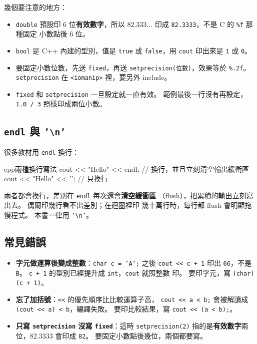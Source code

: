 
幾個要注意的地方：

\begin{itemize}
\item \texttt{double} 預設印 $6$ 位\textbf{有效數字}，所以
$82.333\ldots$ 印成 \texttt{82.3333}，不是 C 的 \texttt{\%f} 那種固定
小數點後 $6$ 位。
\item \texttt{bool} 是 C++ 內建的型別，值是 \texttt{true} 或
\texttt{false}，用 \texttt{cout} 印出來是 \texttt{1} 或 \texttt{0}。
\item 要固定小數位數，先送 \texttt{fixed}，再送
\texttt{setprecision(位數)}，效果等於 \texttt{\%.2f}。
\texttt{setprecision} 在 \texttt{<iomanip>} 裡，要另外 include。
\item \texttt{fixed} 和 \texttt{setprecision} 一旦設定就一直有效。
範例最後一行沒有再設定，\texttt{1.0 / 3} 照樣印成兩位小數。
\end{itemize}

\subsection{\texttt{endl} 與 \texttt{'\textbackslash n'}}

很多教材用 \texttt{endl} 換行：

\begin{code}{cpp}{兩種換行寫法}
cout << "Hello" << endl;   // 換行，並且立刻清空輸出緩衝區
cout << "Hello" << '\n';   // 只換行
\end{code}

兩者都會換行，差別在 \texttt{endl} 每次還會\textbf{清空緩衝區}
（flush），把累積的輸出立刻寫出去。 偶爾印幾行看不出差別；在迴圈裡印
幾十萬行時，每行都 flush 會明顯拖慢程式。 本書一律用
\texttt{'\textbackslash n'}。

\subsection{常見錯誤}

\begin{itemize}
\item \textbf{字元做運算後變成整數}：\texttt{char c = 'A';} 之後
\texttt{cout << c + 1} 印出 \texttt{66}，不是 \texttt{B}。
\texttt{c + 1} 的型別已經提升成 \texttt{int}，\texttt{cout} 就照整數
印。 要印字元，寫 \texttt{(char)(c + 1)}。
\item \textbf{忘了加括號}：\texttt{<<} 的優先順序比比較運算子高，
\texttt{cout << a < b;} 會被解讀成 \texttt{(cout << a) < b}，編譯失敗。
要印比較結果，寫 \texttt{cout << (a < b);}。
\item \textbf{只寫 \texttt{setprecision} 沒寫 \texttt{fixed}}：這時
\texttt{setprecision(2)} 指的是\textbf{有效數字}兩位，$82.3333$ 會印成
\texttt{82}。 要固定小數點後幾位，兩個都要寫。
\end{itemize}

